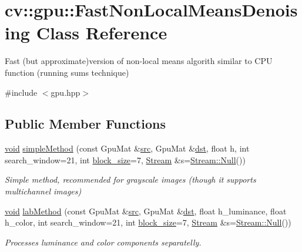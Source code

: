 \hypertarget{classcv_1_1gpu_1_1FastNonLocalMeansDenoising}{\section{cv\-:\-:gpu\-:\-:Fast\-Non\-Local\-Means\-Denoising Class Reference}
\label{classcv_1_1gpu_1_1FastNonLocalMeansDenoising}
}


Fast (but approximate)version of non-\/local means algorith similar to C\-P\-U function (running sums technique)  




{\ttfamily \#include $<$gpu.\-hpp$>$}

\subsection*{Public Member Functions}
\begin{DoxyCompactItemize}
\item 
\hyperlink{legacy_8hpp_a8bb47f092d473522721002c86c13b94e}{void} \hyperlink{classcv_1_1gpu_1_1FastNonLocalMeansDenoising_ad4e2324b8ba12fa05c0ad62bbfc15c24}{simple\-Method} (const Gpu\-Mat \&\hyperlink{legacy_8hpp_a371cd109b74033bc4366f584edd3dacc}{src}, Gpu\-Mat \&\hyperlink{photo__c_8h_aed13e2a25279b24dc954073233fef7a5}{dst}, float h, int search\-\_\-window=21, int \hyperlink{legacy_8hpp_a4a214ca6e8ee1d4806c28a2fe5b4c8e1}{block\-\_\-size}=7, \hyperlink{classcv_1_1gpu_1_1Stream}{Stream} \&s=\hyperlink{classcv_1_1gpu_1_1Stream_af96c23564834f88333dcb8997df553f1}{Stream\-::\-Null}())
\begin{DoxyCompactList}\small\item\em Simple method, recommended for grayscale images (though it supports multichannel images) \end{DoxyCompactList}\item 
\hyperlink{legacy_8hpp_a8bb47f092d473522721002c86c13b94e}{void} \hyperlink{classcv_1_1gpu_1_1FastNonLocalMeansDenoising_a97e34682d51034287319e826df8e22ab}{lab\-Method} (const Gpu\-Mat \&\hyperlink{legacy_8hpp_a371cd109b74033bc4366f584edd3dacc}{src}, Gpu\-Mat \&\hyperlink{photo__c_8h_aed13e2a25279b24dc954073233fef7a5}{dst}, float h\-\_\-luminance, float h\-\_\-color, int search\-\_\-window=21, int \hyperlink{legacy_8hpp_a4a214ca6e8ee1d4806c28a2fe5b4c8e1}{block\-\_\-size}=7, \hyperlink{classcv_1_1gpu_1_1Stream}{Stream} \&s=\hyperlink{classcv_1_1gpu_1_1Stream_af96c23564834f88333dcb8997df553f1}{Stream\-::\-Null}())
\begin{DoxyCompactList}\small\item\em Processes luminance and color components separatelly. \end{DoxyCompactList}\end{DoxyCompactItemize}


